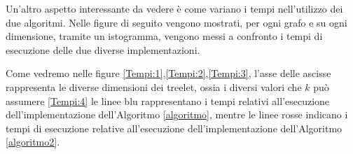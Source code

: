 Un'altro aspetto interessante da vedere è come variano i tempi nell'utilizzo dei due algoritmi.
Nelle figure di seguito vengono mostrati, per ogni grafo e su ogni dimensione, tramite un istogramma, vengono messi a confronto i tempi di esecuzione delle due diverse implementazioni.

Come vedremo nelle figure \ref{Tempi:1},\ref{Tempi:2},\ref{Tempi:3}, l'asse delle ascisse rappresenta le diverse dimensioni dei treelet, ossia i diversi valori che $ k $ può assumere \ref{Tempi:4} le linee blu rappresentano i tempi relativi all'esecuzione dell'implementazione dell'Algoritmo \ref{algoritmo}, mentre le linee rosse indicano i tempi di esecuzione relative all'esecuzione dell'implementazione dell'Algoritmo \ref{algoritmo2}.
\\
\\

